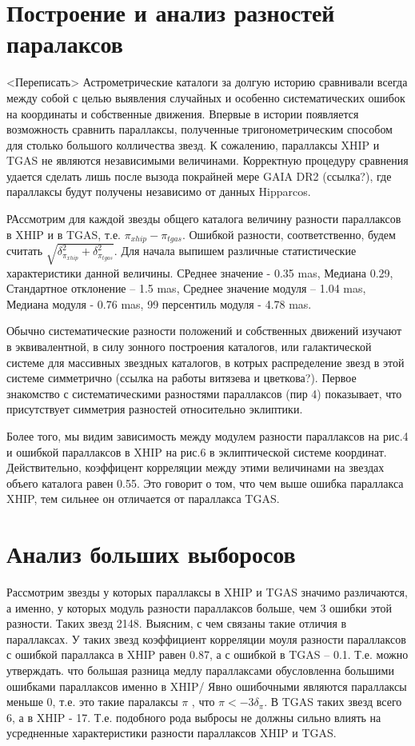 \documentclass[14pt]{article} %
\begin{document}
\section{Построение и анализ разностей паралаксов}\label{errvid}
<Переписать>
Астрометрические каталоги за долгую историю сравнивали  всегда между собой с целью выявления случайных и особенно систематических ошибок на координаты и собственные движения. Впервые в истории появляется возможность сравнить параллаксы, полученные тригонометрическим способом для столько большого колличества звезд. К сожалению, параллаксы XHIP и TGAS  не являются независимыми величинами. Корректную процедуру сравнения удается сделать лишь после вызода покрайней мере GAIA DR2 (ссылка?), где параллаксы будут получены независимо от данных Hipparcos.

РАссмотрим для каждой звезды общего каталога величину разности параллаксов в XHIP и в TGAS, т.е. $\pi_{xhip} - \pi_{tgas}$. Ошибкой разности, соответственно, будем считать $\sqrt{\delta^2_{\pi_{xhip}} + \delta^2_{\pi_{tgas}}}$. Для начала выпишем различные статистические характеристики данной величины. СРеднее значение - 0.35 mas, Медиана 0.29, Стандартное отклонение -- 1.5 mas, Среднее значение модуля -- 1.04 mas, Медиана модуля - 0.76 mas, 99 персентиль модуля - 4.78 mas. 

Обычно систематические разности положений и собственных движений изучают в эквивалентной, в силу зонного построения каталогов, или галактической системе для массивных звездных каталогов, в котрых распределение звезд в этой системе симметрично (ссылка на работы витязева и цветкова?). Первое знакомство с систематическими разностями параллаксов (пир 4) показывает, что присутствует симметрия разностей относительно эклиптики.

Более того, мы видим зависимость между модулем разности параллаксов на рис.4 и ошибкой параллаксов в XHIP на рис.6  в эклиптической системе координат. Действительно, коэффицент корреляции между этими величинами на звездах объего каталога равен 0.55. Это говорит о том, что чем выше ошибка параллакса XHIP, тем сильнее он отличается от параллакса TGAS.

\section{Анализ больших выборосов}\label{errvid}
Рассмотрим звезды у которых параллаксы в XHIP и TGAS  значимо различаются, а именно, у которых модуль разности параллаксов больше, чем 3 ошибки этой разности. Таких звезд 2148. Выясним, с чем связаны такие отличия в параллаксах. У таких звезд коэффициент корреляции моуля разности параллаксов с ошибкой параллакса в XHIP равен 0.87, а с ошибкой в TGAS -- 0.1. Т.е. можно утверждать. что большая разница медлу параллаксами обусловленна большими ошибками параллаксов именно в XHIP/ Явно ошибочными являются параллаксы меньше 0, т.е. это такие паралаксы $\pi$ , что $\pi < -3\delta_{\pi}$. В TGAS таких звезд всего 6, а в XHIP - 17. Т.е. подобного рода выбросы не должны сильно влиять на усредненные характеристики разности параллаксов XHIP и TGAS.
\end{document}
